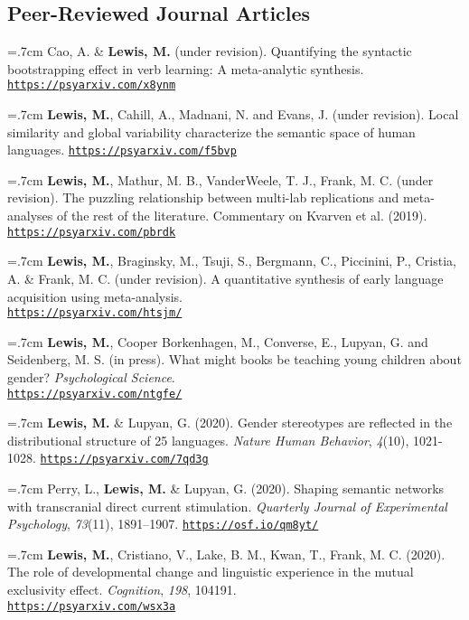 \documentclass[letterpaper]{article}
\begin{document}
\subsection*{Peer-Reviewed Journal Articles}

\onehalfspacing

\hangindent=.7cm Cao, A. \& {\bf Lewis, M.} (under revision). Quantifying the syntactic bootstrapping effect in verb learning: A meta-analytic synthesis. \href{https://psyarxiv.com/x8ynm}{\tt https://psyarxiv.com/x8ynm}


\hangindent=.7cm {\bf Lewis, M.}, Cahill, A., Madnani, N. and Evans, J.  (under revision). Local similarity and global variability characterize the semantic space of human languages.  \href{https://psyarxiv.com/f5bvp}{\tt https://psyarxiv.com/f5bvp}

\hangindent=.7cm {\bf Lewis, M.}, Mathur, M. B., VanderWeele, T. J., Frank, M. C. (under revision). The puzzling relationship between multi-lab replications and meta-analyses of the rest of the literature. Commentary on Kvarven et al. (2019). \href{https://psyarxiv.com/pbrdk}{\tt https://psyarxiv.com/pbrdk}



\hangindent=.7cm {\bf Lewis, M.}, Braginsky, M., Tsuji, S., Bergmann, C., Piccinini, P., Cristia, A. \& Frank, M. C. (under revision). A quantitative synthesis of early language acquisition using meta-analysis. \\ \href{https://psyarxiv.com/htsjm/}{\tt  https://psyarxiv.com/htsjm/}

\hangindent=.7cm {\bf Lewis, M.}, Cooper Borkenhagen, M., Converse, E., Lupyan, G. and Seidenberg, M. S. (in press). What might books be teaching young children about gender? {\it Psychological Science}. \\ \href{https://psyarxiv.com/ntgfe/}{\tt https://psyarxiv.com/ntgfe/}


\hangindent=.7cm {\bf Lewis, M.} \& Lupyan, G. (2020). Gender stereotypes are reflected in the distributional structure of 25 languages.  {\it Nature Human Behavior}, {\it 4}(10), 1021-1028. \href{https://psyarxiv.com/7qd3g}{\tt https://psyarxiv.com/7qd3g}

\hangindent=.7cm Perry, L., {\bf Lewis, M.} \& Lupyan, G. (2020). Shaping semantic networks with transcranial direct current stimulation. {\it Quarterly Journal of Experimental Psychology},  {\it 73}(11), 1891–1907. \href{https://osf.io/qm8yt/}{\tt https://osf.io/qm8yt/}


\hangindent=.7cm {\bf Lewis, M.}, Cristiano, V., Lake, B. M., Kwan, T., Frank, M. C. (2020). The role of developmental change and linguistic experience in the mutual exclusivity effect. {\it Cognition}, {\it 198}, 104191. \\ \href{https://psyarxiv.com/wsx3a}{\tt https://psyarxiv.com/wsx3a}
\end{document}
